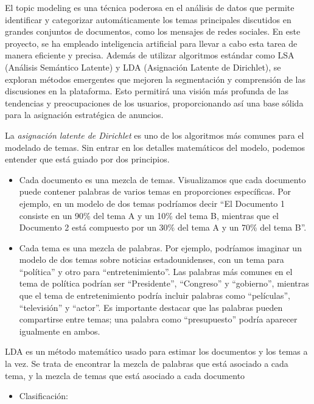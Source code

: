 \documentclass[
  letterpaper,
  DIV=11,
  numbers=noendperiod]{scrartcl}
\providecommand{\tightlist}{%
  \setlength{\itemsep}{0pt}\setlength{\parskip}{0pt}}\usepackage{longtable,booktabs,array}
\begin{document}
El topic modeling es una técnica poderosa en el análisis de datos que
permite identificar y categorizar automáticamente los temas principales
discutidos en grandes conjuntos de documentos, como los mensajes de
redes sociales. En este proyecto, se ha empleado inteligencia artificial
para llevar a cabo esta tarea de manera eficiente y precisa. Además de
utilizar algoritmos estándar como LSA (Análisis Semántico Latente) y LDA
(Asignación Latente de Dirichlet), se exploran métodos emergentes que
mejoren la segmentación y comprensión de las discusiones en la
plataforma. Esto permitirá una visión más profunda de las tendencias y
preocupaciones de los usuarios, proporcionando así una base sólida para
la asignación estratégica de anuncios.

La \emph{asignación latente de Dirichlet} es uno de los algoritmos más
comunes para el modelado de temas. Sin entrar en los detalles
matemáticos del modelo, podemos entender que está guiado por dos
principios.

\begin{itemize}
\item
  Cada documento es una mezcla de temas. Visualizamos que cada documento
  puede contener palabras de varios temas en proporciones específicas.
  Por ejemplo, en un modelo de dos temas podríamos decir ``El Documento
  1 consiste en un 90\% del tema A y un 10\% del tema B, mientras que el
  Documento 2 está compuesto por un 30\% del tema A y un 70\% del tema
  B''.
\item
  Cada tema es una mezcla de palabras. Por ejemplo, podríamos imaginar
  un modelo de dos temas sobre noticias estadounidenses, con un tema
  para ``política'' y otro para ``entretenimiento''. Las palabras más
  comunes en el tema de política podrían ser ``Presidente'',
  ``Congreso'' y ``gobierno'', mientras que el tema de entretenimiento
  podría incluir palabras como ``películas'', ``televisión'' y
  ``actor''. Es importante destacar que las palabras pueden compartirse
  entre temas; una palabra como ``presupuesto'' podría aparecer
  igualmente en ambos.
\end{itemize}

LDA es un método matemático usado para estimar los documentos y los
temas a la vez. Se trata de encontrar la mezcla de palabras que está
asociado a cada tema, y la mezcla de temas que está asociado a cada
documento

\begin{itemize}
\tightlist
\item
  Clasificación:
\end{itemize}
\end{document}
